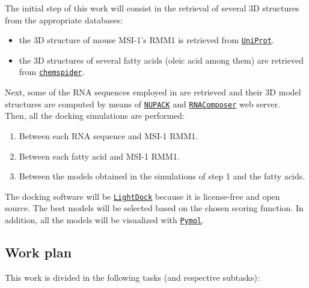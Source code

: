 The initial step of this work will consist in the retrieval of several 3D structures from the appropriate databases:

\begin{itemize}
    \item the 3D structure of mouse MSI-1's RMM1 is retrieved from \href{https://www.uniprot.org/}{\texttt{UniProt}}.
    \item the 3D structures of several fatty acids (oleic acid among them) are retrieved from \href{https://www.chemspider.com/}{\texttt{chemspider}}.
\end{itemize}

Next, some of the RNA sequences employed in \cite{dolcemascolo_2022} are retrieved and their 3D model structures are computed by means of \href{https://nupack.org/}{\texttt{NUPACK}} and \href{https://rnacomposer.cs.put.poznan.pl/}{\texttt{RNAComposer}} web server.\\

Then, all the docking simulations are performed:

\begin{enumerate}
    \item Between each RNA sequence and MSI-1 RMM1.
    \item Between each fatty acid and MSI-1 RMM1.
    \item Between the models obtained in the simulations of step 1 and the fatty acids.
\end{enumerate}

The docking software will be \href{https://lightdock.org/}{\texttt{LightDock}} because it is license-free and open source. The best models will be selected based on the chosen scoring function. In addition, all the models will be visualized with \href{https://pymol.org/2/}{\texttt{Pymol}}.

\subsection{Work plan}

This work is divided in the following tasks (and respective subtasks):

